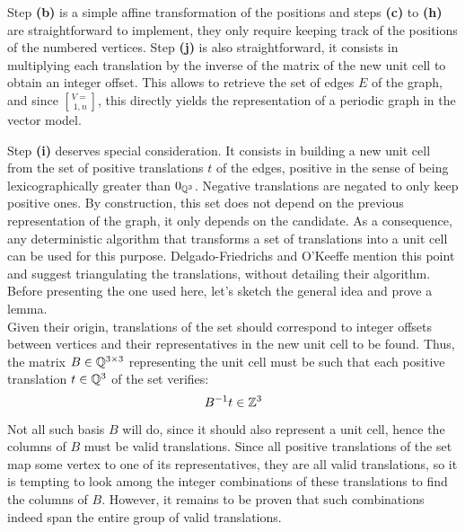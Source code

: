 \documentclass[main.tex]{subfiles}
\begin{document}
Step {\sffamily\small\bfseries(b)} is a simple affine transformation of the positions and steps {\sffamily\small\bfseries(c)} to {\sffamily\small\bfseries(h)} are straightforward to implement, they only require keeping track of the positions of the numbered vertices. Step {\sffamily\small\bfseries(j)} is also straightforward, it consists in multiplying each translation by the inverse of the matrix of the new unit cell to obtain an integer offset. This allows to retrieve the set of edges $E$ of the graph, and since $V = \brack{1,n}$, this directly yields the representation of a periodic graph in the vector model.

\label{triangulate}

Step {\sffamily\small\bfseries(i)} deserves special consideration. It consists in building a new unit cell from the set of positive translations $t$ of the edges, positive in the sense of being lexicographically greater than $0_{\mathbb{Q}^3}$. Negative translations are negated to only keep positive ones. By construction, this set does not depend on the previous representation of the graph, it only depends on the candidate. As a consequence, any deterministic algorithm that transforms a set of translations into a unit cell can be used for this purpose. Delgado-Friedrichs and O'Keeffe \autocite{Systre} mention this point and suggest triangulating the translations, without detailing their algorithm. Before presenting the one used here, let's sketch the general idea and prove a lemma.\\

Given their origin, translations of the set should correspond to integer offsets between vertices and their representatives in the new unit cell to be found. Thus, the matrix $B\in\mathbb{Q}^{3\times3}$ representing the unit cell must be such that each positive translation $t\in\mathbb{Q}^3$ of the set verifies:
\begin{equation}
	B^{-1}t \in\mathbb{Z}^3
	\label{unitcellcondition}
\end{equation}
Not all such basis $B$ will do, since it should also represent a unit cell, hence the columns of $B$ must be valid translations. Since all positive translations of the set map some vertex to one of its representatives, they are all valid translations, so it is tempting to look among the integer combinations of these translations to find the columns of $B$. However, it remains to be proven that such combinations indeed span the entire group of valid translations.
\end{document}
